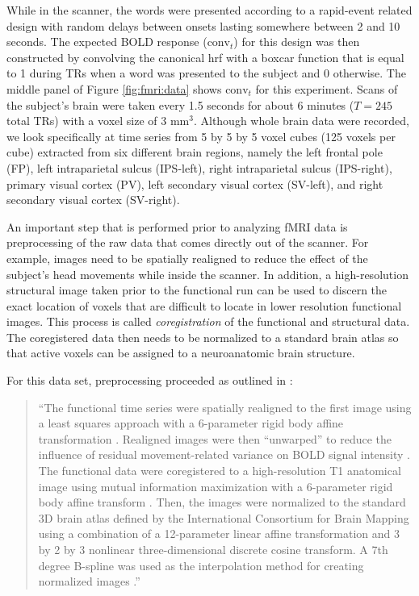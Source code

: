 While in the scanner, the words were presented according to a rapid-event related design with random delays between onsets lasting somewhere between 2 and 10 seconds. The expected BOLD response ($\mbox{conv}_t$) for this design was then constructed by convolving the canonical hrf with a boxcar function that is equal to 1 during TRs when a word was presented to the subject and 0 otherwise. The middle panel of Figure \ref{fig:fmri:data} shows $\mbox{conv}_t$ for this experiment. Scans of the subject's brain were taken every 1.5 seconds for about 6 minutes ($T = 245$ total TRs) with a voxel size of 3 $\mbox{mm}^3$. Although whole brain data were recorded, we look specifically at time series from 5 by 5 by 5 voxel cubes (125 voxels per cube) extracted from six different brain regions, namely the left frontal pole (FP), left intraparietal sulcus (IPS-left), right intraparietal sulcus (IPS-right), primary visual cortex (PV), left secondary visual cortex (SV-left), and right secondary visual cortex (SV-right).

An important step that is performed prior to analyzing fMRI data is preprocessing of the raw data that comes directly out of the scanner. For example, images need to be spatially realigned to reduce the effect of the subject's head movements while inside the scanner. In addition, a high-resolution structural image taken prior to the functional run can be used to discern the exact location of voxels that are difficult to locate in lower resolution functional images. This process is called \emph{coregistration} of the functional and structural data. The coregistered data then needs to be normalized to a standard brain atlas so that active voxels can be assigned to a neuroanatomic brain structure.

For this data set, preprocessing proceeded as outlined in \citet{bennett:miller:2013}:
\begin{quote}
\dsp
``The functional time series were spatially realigned to the first image using a least squares approach with a 6-parameter rigid body affine transformation \citep{friston:ash:spreg:1995}. Realigned images were then ``unwarped'' to reduce the influence of residual movement-related variance on BOLD signal intensity \citep{andersson:deform:2001}. The functional data were coregistered to a high-resolution T1 anatomical image using mutual information maximization with a 6-parameter rigid body affine transform \citep{ashburner:neelin:reg:1997}. Then, the images were normalized to the standard 3D brain atlas defined by the International Consortium for Brain Mapping using a combination of a 12-parameter linear affine transformation and 3 by 2 by 3 nonlinear three-dimensional discrete cosine transform. A 7th degree B-spline was used as the interpolation method for creating normalized images \citep{ashburner:friston:spnorm:1999,mazz:toga:atlas:1995}.''
\end{quote}

